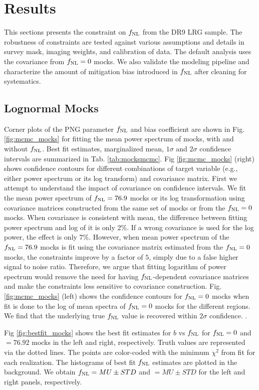 \section{Results}\label{sec:results}
This sections presents the constraint on $f_{\rm NL}$ from the DR9 LRG sample. The robustness of constraints are tested against various assumptions and details in survey mask, imaging weights, and calibration of data. The default analysis uses the covariance from $f_{\rm NL}=0$ mocks. We also validate the modeling pipeline and characterize the amount of mitigation bias introduced in $f_{\rm NL}$ after cleaning for systematics. 


\subsection{Lognormal Mocks}
Corner plots of the PNG parameter $f_{\rm NL}$ and bias coefficient are shown in Fig. \ref{fig:mcmc_mocks} for fitting the mean power spectrum of mocks, with and without $f_{\rm NL}$. Best fit estimates, marginalized mean, $1\sigma$ and $2\sigma$ confidence intervals are summarized in Tab. \ref{tab:mocksmcmc}. Fig \ref{fig:mcmc_mocks} (right) shows confidence contours for different combinations of target variable (e.g., either power spectrum or its log transform) and covariance matrix. First we attempt to understand the impact of covariance on confidence intervals. We fit the mean power spectrum of $f_{\rm NL}=76.9$ mocks or its log transformation using covariance matrices constructed from the same set of mocks or from the $f_{\rm NL}=0$ mocks. When covariance is consistent with mean, the difference between fitting power spectrum and log of it is only 2\%. If a wrong covariance is used for the log power, the effect is only $7\%$. However, when mean power spectrum of the $f_{\rm NL}=76.9$ mocks is fit using the covariance matrix estimated from the $f_{\rm NL}=0$ mocks, the constraints improve by a factor of $5$, simply due to a false higher signal to noise ratio. Therefore, we argue that fitting logarithm of power spectrum would remove the need for having $f_{\rm NL}$-dependent covariance matrices and make the constraints less sensitive to covariance construction. Fig. \ref{fig:mcmc_mocks} (left) shows the confidence contours for $f_{\rm NL}=0$ mocks when fit is done to the log of mean spectra of $f_{\rm NL}=0$ mocks for the different regions. We find that the underlying true $f_{\rm NL}$ value is recovered within $2\sigma$ confidence. .

Fig \ref{fig:bestfit_mocks} shows the best fit estimates for $b$ vs $f_{\rm NL}$ for $f_{\rm NL}=0$ and $=76.92$ mocks in the left and right, respectively. Truth values are represented via the dotted lines. The points are color-coded with the minimum $\chi^{2}$ from fit for each realization. The histograms of best fit $f_{\rm NL}$ estimates are plotted in the background. We obtain $f_{\rm NL}=MU\pm STD$ and $=MU\pm STD$ for the left and right panels, respectively.

